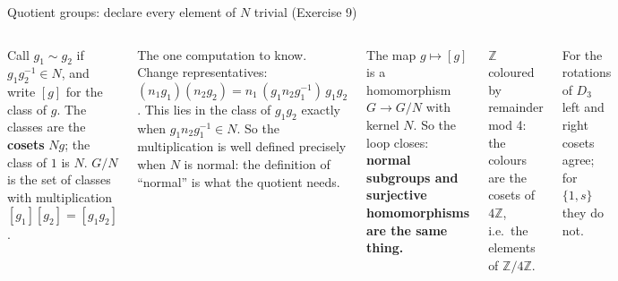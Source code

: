 \documentclass[aspectratio=169,10pt]{beamer}
\newcommand{\Z}{\mathbb{Z}}
\newcommand{\inv}{^{-1}}
\begin{document}
\begin{frame}{Quotient groups: declare every element of $N$ trivial (Exercise 9)}
\begin{columns}[T]
\begin{defbox}
Call $g_1\sim g_2$ if $g_1g_2\inv\in N$, and write $[g]$ for the class of $g$. The classes are the \textbf{cosets} $Ng$; the class of $1$ is $N$. $G/N$ is the set of classes with multiplication $[g_1][g_2]=[g_1g_2]$.
\end{defbox}
\begin{pitbox}
The one computation to know. Change representatives: $(n_1g_1)(n_2g_2)=n_1\,(g_1n_2g_1\inv)\,g_1g_2$. This lies in the class of $g_1g_2$ exactly when $g_1n_2g_1\inv\in N$. So the multiplication is well defined precisely when $N$ is normal: the definition of ``normal'' is what the quotient needs.
\end{pitbox}
\small The map $g\mapsto[g]$ is a homomorphism $G\to G/N$ with kernel $N$. So the loop closes: \textbf{normal subgroups and surjective homomorphisms are the same thing.}
\centering\scalebox{0.6}{\figwrap}\par\vspace{-4pt}
{\scriptsize $\Z$ coloured by remainder mod 4: the colours are the cosets of $4\Z$, i.e.\ the elements of $\Z/4\Z$.}\par\vspace{6pt}
\centering\scalebox{0.5}{\figcosets}\par\vspace{-2pt}
{\scriptsize For the rotations of $D_3$ left and right cosets agree; for $\{1,s\}$ they do not.}
\end{columns}
\end{frame}
\end{document}
